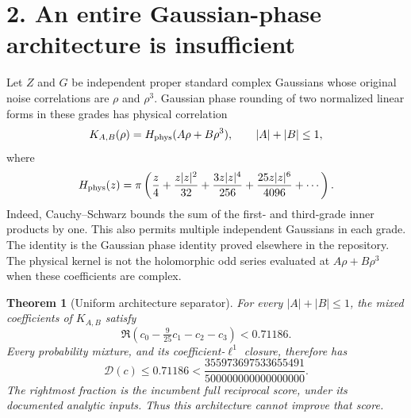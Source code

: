 \documentclass[11pt]{article}
\newcommand{\D}{\mathcal D}
\newtheorem{theorem}{Theorem}
\begin{document}
\section*{2. An entire Gaussian-phase architecture is insufficient}
Let $Z$ and $G$ be independent proper standard complex Gaussians whose original
noise correlations are $\rho$ and $\rho^3$. Gaussian phase rounding of two
normalized linear forms in these grades has physical correlation
\[
 K_{A,B}(\rho)=H_{\rm phys}(A\rho+B\rho^3),\qquad |A|+|B|\le1,
\]
where
\[
 H_{\rm phys}(z)=\pi\left(\frac z4+\frac{z|z|^2}{32}
 +\frac{3z|z|^4}{256}+\frac{25z|z|^6}{4096}+\cdots\right).
\]
Indeed, Cauchy--Schwarz bounds the sum of the first- and third-grade inner
products by one. This also permits multiple independent Gaussians in each
grade. The identity is the Gaussian phase identity proved elsewhere in the
repository. The physical kernel is not the holomorphic odd series evaluated
at $A\rho+B\rho^3$ when these coefficients are complex.

\begin{theorem}[Uniform architecture separator]
For every $|A|+|B|\le1$, the mixed coefficients of $K_{A,B}$ satisfy
\[
 \Re(c_0-\tfrac9{25}c_1-c_2-c_3)<0.71186.
 \tag{5}
\]
Every probability mixture, and its coefficient-$\ell^1$ closure, therefore has
\[
 \boxed{\D(c)\le0.71186<
 \frac{355973697533655491}{500000000000000000}.}\tag{6}
\]
The rightmost fraction is the incumbent full reciprocal score, under its
documented analytic inputs. Thus this architecture cannot improve that score.
\end{theorem}
\end{document}
